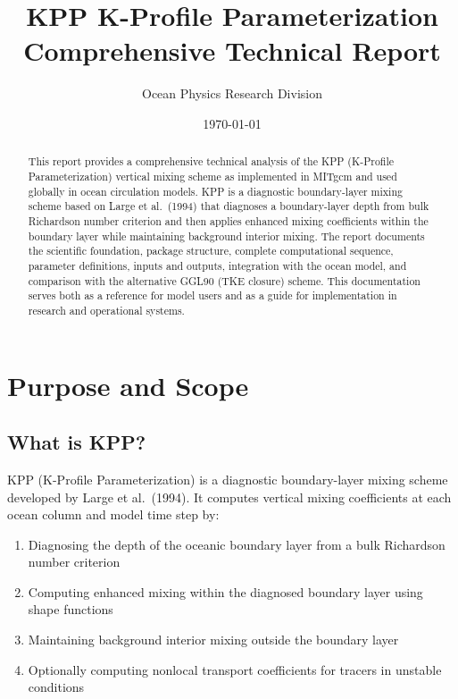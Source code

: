 \documentclass[11pt, a4paper]{article}
\title{\textbf{KPP K-Profile Parameterization} \\ \large Comprehensive Technical Report}
\author{Ocean Physics Research Division}
\date{\today}
\begin{document}
\maketitle

\begin{abstract}
This report provides a comprehensive technical analysis of the KPP (K-Profile Parameterization) vertical mixing scheme as implemented in MITgcm and used globally in ocean circulation models. KPP is a diagnostic boundary-layer mixing scheme based on Large et al.\ (1994) that diagnoses a boundary-layer depth from bulk Richardson number criterion and then applies enhanced mixing coefficients within the boundary layer while maintaining background interior mixing. The report documents the scientific foundation, package structure, complete computational sequence, parameter definitions, inputs and outputs, integration with the ocean model, and comparison with the alternative GGL90 (TKE closure) scheme. This documentation serves both as a reference for model users and as a guide for implementation in research and operational systems.
\end{abstract}

\tableofcontents
\newpage

\section{Purpose and Scope}

\subsection{What is KPP?}

KPP (K-Profile Parameterization) is a diagnostic boundary-layer mixing scheme developed by Large et al.\ (1994). It computes vertical mixing coefficients at each ocean column and model time step by:

\begin{enumerate}
    \item Diagnosing the depth of the oceanic boundary layer from a bulk Richardson number criterion
    \item Computing enhanced mixing within the diagnosed boundary layer using shape functions
    \item Maintaining background interior mixing outside the boundary layer
    \item Optionally computing nonlocal transport coefficients for tracers in unstable conditions
\end{enumerate}
\end{document}
